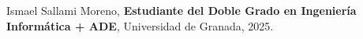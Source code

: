\documentclass[a4paper,12pt]{book}
\begin{document}
%



%



\newpage
\begin{thebibliography}{99}
Ismael Sallami Moreno, \textbf{Estudiante del Doble Grado en Ingeniería Informática + ADE}, Universidad de Granada, 2025.

\end{thebibliography}
\end{document}

